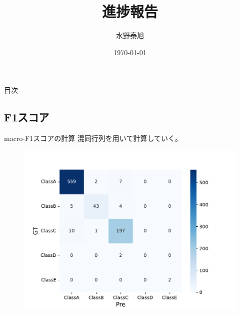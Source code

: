 \documentclass[leno,xcolor=dvipsnames]{beamer}
\title{進捗報告}
\date{\today}
\author{水野泰旭}
\institute{弘前大学理工学部電子情報工学科４年}
\begin{document}
  \maketitle

  \begin{frame}{目次}
    \tableofcontents
  \end{frame}

  \begin{frame}
    \section{F1スコア}
  \end{frame}

  \begin{frame}{macro-F1スコアの計算}
    混同行列を用いて計算していく。
    \begin{figure}[H]
      \centering  
      \includegraphics[keepaspectratio, scale=0.5]{images/deepimfam_confusion_matrix_cnt.pdf}
    \end{figure}
  \end{frame}
\end{document}
